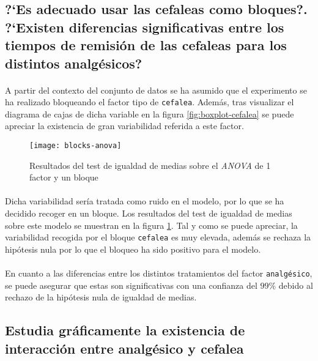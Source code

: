 \documentclass[11pt]{article}
\begin{document}
    \subsection{?`Es adecuado usar las cefaleas como bloques?. ?`Existen diferencias significativas entre los tiempos de remisión de las cefaleas para los distintos analgésicos?}

      \paragraph{}
      A partir del contexto del conjunto de datos se ha asumido que el experimento se ha realizado bloqueando el factor tipo de \texttt{cefalea}. Además, tras visualizar el diagrama de cajas de dicha variable en la figura \ref{fig:boxplot-cefalea} se puede apreciar la existencia de gran variabilidad referida a este factor.

      \begin{figure}[!h]
        \centering
        \texttt{[image: blocks-anova]}
        \caption{Resultados del test de igualdad de medias sobre el \emph{ANOVA} de 1 factor y un bloque}
        \label{fig:1f1b-anova-results}
      \end{figure}

      \paragraph{}
      Dicha variabilidad sería tratada como ruido en el modelo, por lo que se ha decidido recoger en un bloque. Los resultados del test de igualdad de medias sobre este modelo se muestran en la figura \ref{fig:1f1b-anova-results}. Tal y como se puede apreciar, la variabilidad recogida por el bloque \texttt{cefalea} es muy elevada, además se rechaza la hipótesis nula por lo que el bloqueo ha sido positivo para el modelo.

      \paragraph{}
      En cuanto a las diferencias entre los distintos tratamientos del factor \texttt{analgésico}, se puede asegurar que estas son significativas con una confianza del $99\%$ debido al rechazo de la hipótesis nula de igualdad de medias.

    \subsection{Estudia gráficamente la existencia de interacción entre analgésico y cefalea}
\end{document}
